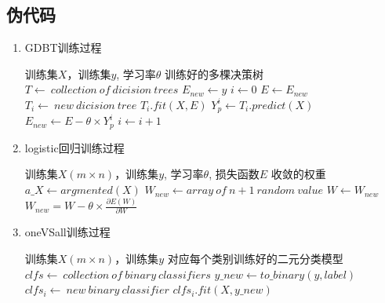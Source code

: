 \documentclass[UTF8,a4paper,12pt]{article}
\begin{document}
\subsection{伪代码}
\begin{enumerate}[itemindent=0.5em,label=\arabic*、]
  \item GDBT训练过程
  \begin{algorithm}
        \begin{algorithmic}[1] %
            \Require 训练集$X$，训练集$y$, 学习率$\theta$
            \Ensure 训练好的多棵决策树
                \State $T \gets\ collection\ of\ dicision\ trees$
                \State $E_{new} \gets y$
                \State $i \gets 0$
                \Repeat
                  \State $E \gets E_{new}$
                  \State $T_i \gets\ new\ dicision\ tree$
                  \State $T_i.fit(X, E)$
                  \State $Y^i_p \gets T_i.predict(X)$
                  \State $E_{new} \gets E - \theta \times Y^i_p$
                  \State $i \gets i + 1$
                \State{}
            \EndFunction
        \end{algorithmic}
    \end{algorithm}

    \newpage
    \item logistic回归训练过程
    \begin{algorithm}
          \begin{algorithmic}[1] %
              \Require 训练集$X(m \times n)$，训练集$y$, 学习率$\theta$, 损失函数$E$
              \Ensure 收敛的权重
                  \State $a\_X \gets argmented(X)$
                  \State $W_{new} \gets array\ of\ n+1\ random\ value$
                  \Repeat
                    \State $W \gets W_{new}$
                    \State $W_{new} = W - \theta \times \frac{\partial{E(W)}}{\partial{W}}$
                  \State{}
              \EndFunction
          \end{algorithmic}
      \end{algorithm}

      \item oneVSall训练过程
      \begin{algorithm}
            \begin{algorithmic}[1] %
                \Require 训练集$X(m \times n)$，训练集$y$
                \Ensure 对应每个类别训练好的二元分类模型
                    \State $clfs \gets\ collection\ of\ binary\ classifiers$
                        \State $y\_new \gets to\_binary(y, label)$
                        \State $clfs_i \gets\ new\ binary\ classifier$
                        \State $clfs_i.fit(X, y\_new)$
                    \EndFor
                    \State{}
                \EndFunction
            \end{algorithmic}
        \end{algorithm}
\end{enumerate}
\end{document}
